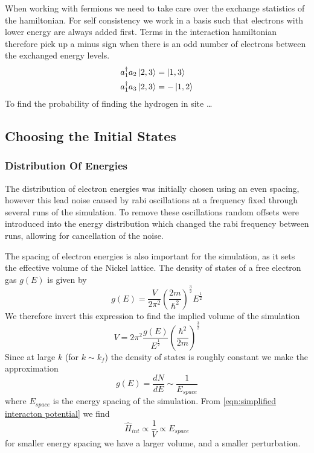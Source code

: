 When working with
fermions we need to take
care over the exchange
statistics of the hamiltonian.
For self consistency we work in
a basis such that electrons
with lower energy are always
added first. Terms in the interaction
hamiltonian therefore pick
up a minus sign when there is
an odd number of electrons
between the exchanged energy levels.
\begin{align}
    a^\dagger_1a_2 \ket{2,3} & = \ket{1,3}  \\
    a^\dagger_1a_3 \ket{2,3} & = -\ket{1,2}
\end{align}
To find the probability
of finding the hydrogen in site \ldots

\subsection{Choosing the Initial States}

\subsubsection{Distribution Of Energies}
The distribution of electron energies was
initially chosen using an even spacing,
however this lead noise caused
by rabi oscillations
at a frequency
fixed through several runs
of the simulation.
To remove these oscillations
random offsets were introduced
into the energy distribution
which changed the rabi frequency
between runs,
allowing for cancellation
of the noise.

The spacing of electron energies is also
important for the simulation, as it
sets the effective volume of the Nickel
lattice. The density of states of a free electron
gas \(g(E)\) is given by~\cite{KittelCharles1953Itss}
\begin{equation}
    g(E) = \frac{V}{2\pi^2}
    {(\frac{2m}{\hbar^2})}^{\frac{3}{2}}
    E^{\frac{1}{2}}
\end{equation}
We therefore invert this expression
to find the implied volume of the
simulation
\begin{equation}
    V = 2\pi^2
    \frac{g(E)}{E^{\frac{1}{2}}}
    {(\frac{\hbar^2}{2m})}^{\frac{3}{2}}
\end{equation}
Since at large \(k\)
(for \(k\sim k_f\))
the density of states is roughly
constant we make the approximation
\begin{equation}
    g(E) = \frac{dN}{dE} \sim \frac{1}{E_{space}}
\end{equation}
where \(E_{space}\) is the energy spacing
of the simulation. From \cref{eqn:simplified interacton potential} we find
\begin{equation}
    \hat{H}_{int} \propto \frac{1}{V} \propto E_{space}
    \label{eqn:energy spacing dependance of interaction hamiltonian}
\end{equation}
for smaller
energy spacing we have
a larger volume, and a smaller
perturbation.

